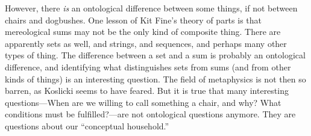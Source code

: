 \documentclass[11pt]{article}
\begin{document}
\begin{spacing}{1.5}
However, there {\em is} an ontological difference between some things,
if not between chairs and dogbushes.  One lesson of Kit Fine's theory
of parts is that mereological sums may not be the only kind of
composite thing.  There are apparently sets as well, and strings, and
sequences, and perhaps many other types of thing.  The difference
between a set and a sum is probably an ontological difference, and
identifying what distinguishes sets from sums (and from other kinds of
things) is an interesting question.  The field of metaphysics is not
then so barren, as Koslicki seems to have feared.  But it is true that
many interesting questions---When are we willing to call something a
chair, and why?  What conditions must be fulfilled?---are not
ontological questions anymore.  They are questions about our
``conceptual household.''

\ifstandalone
\end{spacing}


\fi
\end{document}
